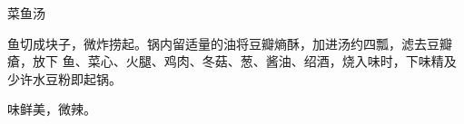 \begin{recipe}{菜鱼汤}

\ingredients


\cooking

鱼切成块子，微炸捞起。锅内留适量的油将豆瓣熵酥，加进汤约四瓢，滤去豆瓣瘡，放下
鱼、菜心、火腿、鸡肉、冬菇、葱、酱油、绍酒，烧入味时，下味精及少许水豆粉即起锅。

\notes

味鲜美，微辣。

\end{recipe}

